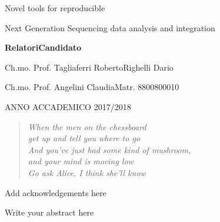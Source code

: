\documentclass[b5paper,oneside,british,intoc,bibliograph=totoc,index=totoc,BCOR10mm,twoside,openright]{book}
\numberwithin{equation}{section}
\numberwithin{figure}{section}
\begin{document}
\vspace{1.5cm}

\begin{center}
Novel tools for reproducible 

Next Generation Sequencing data analysis and integration
\par\end{center}

\vspace{1.5cm}

\textbf{\large{}Relatori}\hfill{}\textbf{\large{}Candidato}{\large \par}

Ch.mo. Prof. Tagliaferri Roberto\hfill{}Righelli Dario

Ch.mo. Prof. Angelini Claudia\hfill{}Matr. 8800800010

\vspace{1.5cm}

\begin{center}
ANNO ACCADEMICO 2017/2018
\par\end{center}

\cleardoublepage

\begin{quotation}
\begin{flushright}
\textit{
When the men on the chessboard\\get up and tell you where to go\\
And you've just had some kind of mushroom,\\and your mind is moving low\\
Go ask Alice, I think she'll know\\
}
\par\end{flushright}
\end{quotation}


\cleardoublepage
{}

Add acknowledgements here
%

\cleardoublepage


Write your abstract here


\hypersetup{hidelinks} %

\pagestyle{plain}\tableofcontents

\cleardoublepage{}
\pagestyle{fancy}
\end{document}
